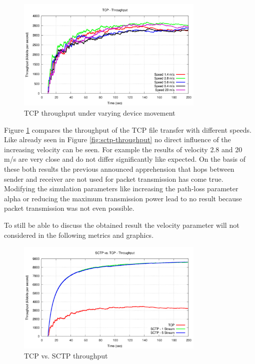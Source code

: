 \documentclass[a4paper]{article}
\begin{document}
\begin{figure}[H]
	\centering
	\includegraphics[width=0.8\textwidth]{imgs/tcp-throughput.png}
	\caption{TCP throughput under varying device movement}
	\label{fig:tcp-throughput}
\end{figure}

Figure \ref{fig:tcp-throughput} compares the throughput of the TCP file transfer with different speeds. Like already seen in Figure \ref{fig:sctp-throughput} no direct influence of the increasing velocity can be seen. For example the results of velocity 2.8 and 20 m/s are very close and do not differ significantly like expected. On the basis of these both results the previous announced apprehension that hops between sender and receiver are not used for packet transmission has come true. Modifying the simulation parameters like increasing the path-loss parameter alpha or reducing the maximum transmission power lead to no result because packet transmission was not even possible.

To still be able to discuss the obtained result the velocity parameter will not considered in the following metrics and graphics.

\begin{figure}[H]
	\centering
	\includegraphics[width=0.8\textwidth]{imgs/sctp-vs-tcp-throughput.png}
	\caption{TCP vs. SCTP throughput}
	\label{fig:tcp-vs-sctp-throughput}
\end{figure}
\end{document}
